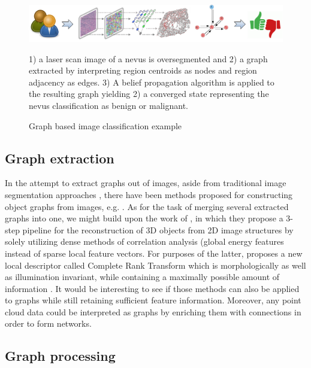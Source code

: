 	\begin{figure}[ht]
		\begin{center}
			\includegraphics[width=1\textwidth]{figures/graph_img_class}
			\caption{Graph based image classification example}
			\label{fig_graph_based_img_classification}
		\end{center}
		\small
		1) a laser scan image of a nevus is oversegmented and 2) a graph extracted by interpreting region centroids as nodes and region adjacency as edges. 3) A belief propagation algorithm is applied to the resulting graph yielding 2) a converged state representing the nevus classification as benign or malignant.
	\end{figure}
		
		\subsection{Graph extraction}
		\label{ssect:graph_extraction}
	
		In the attempt to extract graphs out of images, aside from traditional image segmentation approaches \citep{FelzenszwalbHuttenlocher2004}, there have been methods proposed for constructing object graphs from images, e.g. \citep{LeeObjectGraphs2012}. As for the task of merging several extracted graphs into one, we might build upon the work of \citep{Schneevoigt2014}, in which they propose a 3-step pipeline for the reconstruction of 3D objects from 2D image structures by solely utilizing dense methods of correlation analysis (global energy features instead of sparse local feature vectors. For purposes of the latter, \citep{Demetz2013} proposes a new local descriptor called Complete Rank Transform which is morphologically as well as illumination invariant, while containing a maximally possible amount of information \citep{Bobylev2014}. It would be interesting to see if those methods can also be applied to graphs while still retaining sufficient feature information. Moreover, any point cloud data \citep{PointCloudPaper2014} could be interpreted as graphs by enriching them with connections in order to form networks.
		
		\subsection{Graph processing}
		\label{ssect:graph_processing}
		
